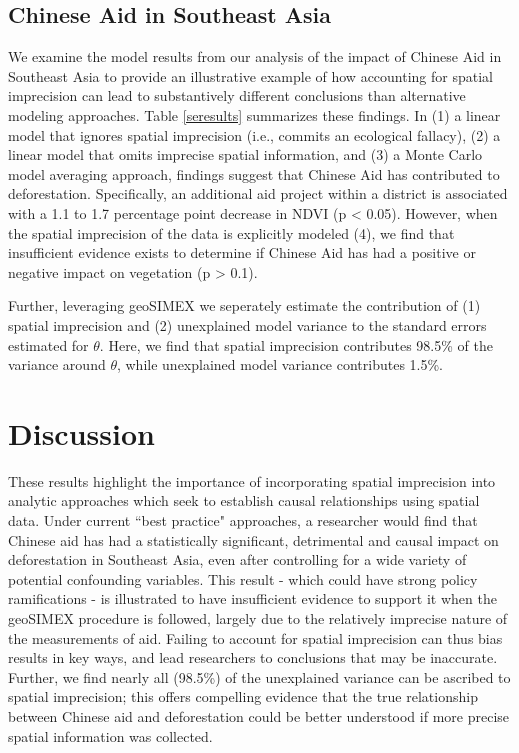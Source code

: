 \subsection{Chinese Aid in Southeast Asia}
We examine the model results from our analysis of the impact of Chinese Aid in Southeast Asia to provide an illustrative example of how accounting for spatial imprecision can lead to substantively different conclusions than alternative modeling approaches.
Table \ref{seresults} summarizes these findings.
In (1) a linear model that ignores spatial imprecision (i.e., commits an ecological fallacy), (2) a linear model that omits imprecise spatial information, and (3) a Monte Carlo model averaging approach, findings suggest that Chinese Aid has contributed to deforestation. Specifically, an additional aid project within a district is associated with a 1.1 to 1.7 percentage point decrease in NDVI (p < 0.05).
However, when the spatial imprecision of the data is explicitly modeled (4), we find that insufficient evidence exists to determine if Chinese Aid has had a positive or negative impact on vegetation (p > 0.1).
\par
Further, leveraging geoSIMEX we seperately estimate the contribution of (1) spatial imprecision and (2) unexplained model variance to the standard errors estimated for $\theta$.
Here, we find that spatial imprecision contributes 98.5\% of the variance around $\theta$, while unexplained model variance contributes 1.5\%.


\section{Discussion}
These results highlight the importance of incorporating spatial imprecision into analytic approaches which seek to establish causal relationships using spatial data.
Under current ``best practice" approaches, a researcher would find that Chinese aid has had a statistically significant, detrimental and causal impact on deforestation in Southeast Asia, even after controlling for a wide variety of potential confounding variables.
This result - which could have strong policy ramifications - is illustrated to have insufficient evidence to support it when the geoSIMEX procedure is followed, largely due to the relatively imprecise nature of the measurements of aid.
Failing to account for spatial imprecision can thus bias results in key ways, and lead researchers to conclusions that may be inaccurate.
Further, we find nearly all (98.5\%) of the unexplained variance can be ascribed to spatial imprecision; this offers compelling evidence that the true relationship between Chinese aid and deforestation could be better understood if more precise spatial information was collected.
